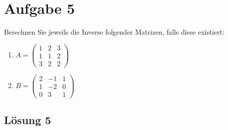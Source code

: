 \documentclass[main.tex]{subfiles}
\begin{document}
\section{Aufgabe 5}
Berechnen Sie jeweils die Inverse folgender Matrizen, falls diese existiert:

\begin{enumerate}
    \item $A = \begin{pmatrix}
        1 & 2 & 3 \\
        1 & 1 & 2 \\
        3 & 2 & 2
    \end{pmatrix}$ \\
    \item $B = \begin{pmatrix}
        2 & -1 & 1 \\
        1 & -2 & 0 \\
        0 &  3 & 1 
    \end{pmatrix}$
\end{enumerate}

\subsection{Lösung 5}
\end{document}
